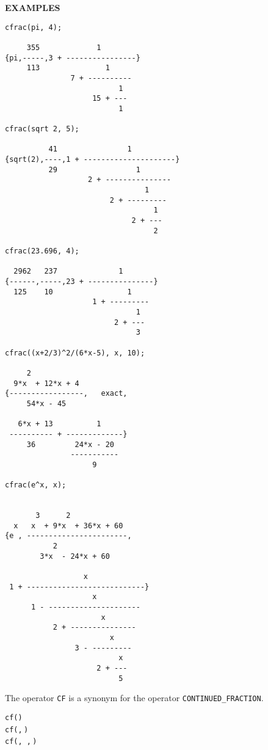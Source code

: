 \large{\textbf{EXAMPLES}}
\begin{verbatim}
cfrac(pi, 4);

     355             1
{pi,-----,3 + ----------------}
     113               1
               7 + ----------
                          1
                    15 + ---
                          1

cfrac(sqrt 2, 5);

          41                1
{sqrt(2),----,1 + ---------------------}
          29                  1
                   2 + ---------------
                                1
                        2 + ---------
                                  1
                             2 + ---
                                  2

cfrac(23.696, 4);

  2962   237              1
{------,-----,23 + ---------------}
  125    10                 1
                    1 + ---------
                              1
                         2 + ---
                              3

cfrac((x+2/3)^2/(6*x-5), x, 10);

     2
  9*x  + 12*x + 4
{-----------------,   exact,
     54*x - 45

   6*x + 13          1
 ---------- + -------------}
     36         24*x - 20
               -----------
                    9

cfrac(e^x, x);


       3      2
  x   x  + 9*x  + 36*x + 60
{e , -----------------------,
           2
        3*x  - 24*x + 60

                  x
 1 + ---------------------------}
                    x
      1 - ---------------------
                      x
           2 + ---------------
                        x
                3 - ---------
                          x
                     2 + ---
                          5
\end{verbatim}

\hypertarget{CF:operator}{}

The operator \texttt{CF}  is a 
synonym for the operator \texttt{CONTINUED\_FRACTION}.
\begin{syntaxtable}
  \texttt{cf(}\texttt{)}\\
  \texttt{cf(}\texttt{,}\,\texttt{)}\\
  \texttt{cf(}\texttt{,}\,%
  \texttt{,}\,\texttt{)}
\end{syntaxtable}

